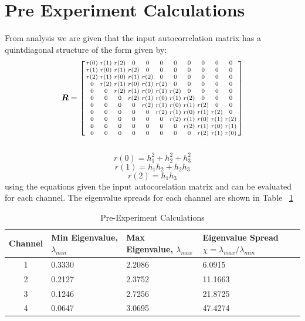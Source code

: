 \documentclass[journal]{IEEEtran}
\begin{document}
\section{Pre Experiment Calculations}
From analysis we are given that the input autocorrelation matrix has
a quintdiagonal structure of the form given by:\\
\[
\boldsymbol{R}=
    \begin{bsmallmatrix}
    r(0) & r(1) & r(2) & 0 & 0 & 0 & 0 & 0 & 0 & 0 & 0\\
    r(1) & r(0) & r(1) & r(2) & 0 & 0 & 0 & 0 & 0 & 0 & 0\\
    r(2) & r(1) & r(0) & r(1) & r(2) & 0 & 0 & 0 & 0 & 0 & 0\\
    0 & r(2) & r(1) & r(0) & r(1) & r(2) & 0 & 0 & 0 & 0 & 0\\
    0 & 0 & r(2) & r(1) & r(0) & r(1) & r(2) & 0 & 0 & 0 & 0\\
    0 & 0 & 0 & r(2) & r(1) & r(0) & r(1) & r(2) & 0 & 0 & 0\\
    0 & 0 & 0 & 0 & r(2) & r(1) & r(0) & r(1) & r(2) & 0 & 0\\
    0 & 0 & 0 & 0 & 0 & r(2) & r(1) & r(0) & r(1) & r(2) & 0\\
    0 & 0 & 0 & 0 & 0 & 0 & r(2) & r(1) & r(0) & r(1) & r(2)\\
    0 & 0 & 0 & 0 & 0 & 0 & 0 & r(2) & r(1) & r(0) & r(1)\\
    0 & 0 & 0 & 0 & 0 & 0 & 0 & 0 & r(2) & r(1) & r(0)\\
  \end{bsmallmatrix}
\]
\\
$$  r(0) = h_1^2 + h_2^2 + h_3^2 $$
$$  r(1) = h_1h_2 + h_2h_3 $$
$$  r(2) = h_1h_3 $$
using the equations given the input autocorelation matrix and can be evaluated
for each channel. The eigenvalue spreads for each channel are shown in Table ~\ref{table:eigenspread}
\linespread{0.8}
\begin{table}[H]
  \centering
 \begin{tabular}{ | c || p{1.5cm} | p{1.5cm} | p{1.5cm} |}
    \hline
    Channel & Min Eigenvalue, $\lambda_{min}$  & Max Eigenvalue, $\lambda_{max}$ & Eigenvalue Spread $\chi = \lambda_{max}/\lambda_{min}$\\
    \hline\hline
    1 & 0.3330 & 2.2086 & 6.0915 \\
    \hline
    2 & 0.2127 & 2.3752 & 11.1663 \\
    \hline
    3 & 0.1246 & 2.7256 & 21.8725 \\
    \hline
    4 & 0.0647 & 3.0695 & 47.4274 \\
    \hline
  \end{tabular}
  \caption{Pre-Experiment Calculations}
  \label{table:eigenspread}
\end{table}
\end{document}
